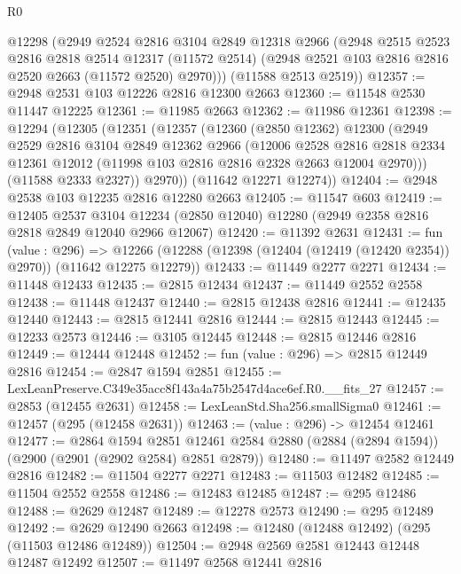 \begin{lexlean}{R0}
\begin{coremodule}
      @12298
      (@2949
        @2524
        @2816
        @3104
        @2849
        @12318
        @2966
        (@2948
          @2515
          @2523
          @2816
          @2818
          @2514
          @12317
          (@11572 @2514)
          (@2948 @2521 @103 @2816 @2816 @2520 @2663 (@11572 @2520) @2970)))
      (@11588 @2513 @2519))
@12357 := @2948 @2531 @103 @12226 @2816 @12300 @2663
@12360 := @11548 @2530 @11447 @12225
@12361 := @11985 @2663
@12362 := @11986 @12361
@12398 := @12294
    (@12305
      (@12351
        (@12357
          (@12360
            (@2850 @12362)
            @12300
            (@2949
              @2529
              @2816
              @3104
              @2849
              @12362
              @2966
              (@12006
                @2528
                @2816
                @2818
                @2334
                @12361
                @12012
                (@11998 @103 @2816 @2816 @2328 @2663 @12004 @2970)))
            (@11588 @2333 @2327))
          @2970))
      (@11642 @12271 @12274))
@12404 := @2948 @2538 @103 @12235 @2816 @12280 @2663
@12405 := @11547 @603
@12419 := @12405
    @2537
    @3104
    @12234
    (@2850 @12040)
    @12280
    (@2949 @2358 @2816 @2818 @2849 @12040 @2966 @12067)
@12420 := @11392 @2631
@12431 := fun (value : @296) =>
  @12266 (@12288 (@12398 (@12404 (@12419 (@12420 @2354)) @2970)) (@11642 @12275 @12279))
@12433 := @11449 @2277 @2271
@12434 := @11448 @12433
@12435 := @2815 @12434
@12437 := @11449 @2552 @2558
@12438 := @11448 @12437
@12440 := @2815 @12438 @2816
@12441 := @12435 @12440
@12443 := @2815 @12441 @2816
@12444 := @2815 @12443
@12445 := @12233 @2573
@12446 := @3105 @12445
@12448 := @2815 @12446 @2816
@12449 := @12444 @12448
@12452 := fun (value : @296) => @2815 @12449 @2816
@12454 := @2847 @1594 @2851
@12455 := LexLeanPreserve.C349e35acc8f143a4a75b2547d4ace6ef.R0.__fits_27
@12457 := @2853 (@12455 @2631)
@12458 := LexLeanStd.Sha256.smallSigma0
@12461 := @12457 (@295 (@12458 @2631))
@12463 := (value : @296) -> @12454 @12461
@12477 := @2864
    @1594
    @2851
    @12461
    @2584
    @2880
    (@2884 (@2894 @1594))
    (@2900 (@2901 (@2902 @2584) @2851 @2879))
@12480 := @11497 @2582 @12449 @2816
@12482 := @11504 @2277 @2271
@12483 := @11503 @12482
@12485 := @11504 @2552 @2558
@12486 := @12483 @12485
@12487 := @295 @12486
@12488 := @2629 @12487
@12489 := @12278 @2573
@12490 := @295 @12489
@12492 := @2629 @12490 @2663
@12498 := @12480 (@12488 @12492) (@295 (@11503 @12486 @12489))
@12504 := @2948 @2569 @2581 @12443 @12448 @12487 @12492
@12507 := @11497 @2568 @12441 @2816

\end{coremodule}
\end{lexlean}
